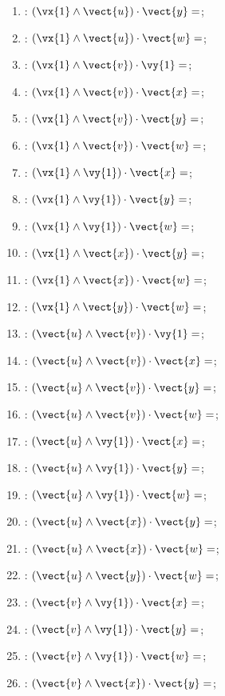 \begin{multicols}{2}
\begin{enumerate}
\item : $\left(\vx{1}\wedge\vect{u}\right)\cdot\vect{y} =$;
\item : $\left(\vx{1}\wedge\vect{u}\right)\cdot\vect{w} =$;
\item : $\left(\vx{1}\wedge\vect{v}\right)\cdot\vy{1} =$;
\item : $\left(\vx{1}\wedge\vect{v}\right)\cdot\vect{x} =$;
\item : $\left(\vx{1}\wedge\vect{v}\right)\cdot\vect{y} =$;
\item : $\left(\vx{1}\wedge\vect{v}\right)\cdot\vect{w} =$;
\item : $\left(\vx{1}\wedge\vy{1}\right)\cdot\vect{x} =$;
\item : $\left(\vx{1}\wedge\vy{1}\right)\cdot\vect{y} =$;
\item : $\left(\vx{1}\wedge\vy{1}\right)\cdot\vect{w} =$;
\item : $\left(\vx{1}\wedge\vect{x}\right)\cdot\vect{y} =$;
\item : $\left(\vx{1}\wedge\vect{x}\right)\cdot\vect{w} =$;
\item : $\left(\vx{1}\wedge\vect{y}\right)\cdot\vect{w} =$;
\item : $\left(\vect{u}\wedge\vect{v}\right)\cdot\vy{1} =$;
\item : $\left(\vect{u}\wedge\vect{v}\right)\cdot\vect{x} =$;
\item : $\left(\vect{u}\wedge\vect{v}\right)\cdot\vect{y} =$;
\item : $\left(\vect{u}\wedge\vect{v}\right)\cdot\vect{w} =$;
\item : $\left(\vect{u}\wedge\vy{1}\right)\cdot\vect{x} =$;
\item : $\left(\vect{u}\wedge\vy{1}\right)\cdot\vect{y} =$;
\item : $\left(\vect{u}\wedge\vy{1}\right)\cdot\vect{w} =$;
\item : $\left(\vect{u}\wedge\vect{x}\right)\cdot\vect{y} =$;
\item : $\left(\vect{u}\wedge\vect{x}\right)\cdot\vect{w} =$;
\item : $\left(\vect{u}\wedge\vect{y}\right)\cdot\vect{w} =$;
\item : $\left(\vect{v}\wedge\vy{1}\right)\cdot\vect{x} =$;
\item : $\left(\vect{v}\wedge\vy{1}\right)\cdot\vect{y} =$;
\item : $\left(\vect{v}\wedge\vy{1}\right)\cdot\vect{w} =$;
\item : $\left(\vect{v}\wedge\vect{x}\right)\cdot\vect{y} =$;

\end{enumerate}
\end{multicols}
